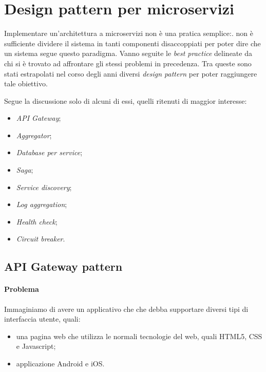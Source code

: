 
\section{Design pattern per microservizi}

Implementare un'architettura a microservizi non è una pratica semplice:. non è sufficiente dividere il sistema in tanti componenti disaccoppiati per poter dire che un sistema segue questo paradigma.
Vanno seguite le \textit{best practice} delineate da chi si è trovato ad affrontare gli stessi problemi in precedenza.
Tra queste sono stati estrapolati nel corso degli anni diversi \textit{design pattern} per poter raggiungere tale obiettivo.

Segue la discussione solo di alcuni di essi, quelli ritenuti di maggior interesse:

\begin{itemize}
	\item \textit{API Gateway};
	\item \textit{Aggregator};

	\item \textit{Database per service};
	\item \textit{Saga};

	\item \textit{Service discovery};
	\item \textit{Log aggregation};
	\item \textit{Health check};
	\item \textit{Circuit breaker}.
\end{itemize}


\subsection{API Gateway pattern}

\paragraph*{Problema} Immaginiamo di avere un applicativo che  che debba supportare diversi tipi di interfaccia utente, quali: 
\begin{itemize}[noitemsep]
	\item una pagina web che utilizza le normali tecnologie del web, quali HTML5, CSS e Javascript;
	\item applicazione Android e iOS.
\end{itemize}

